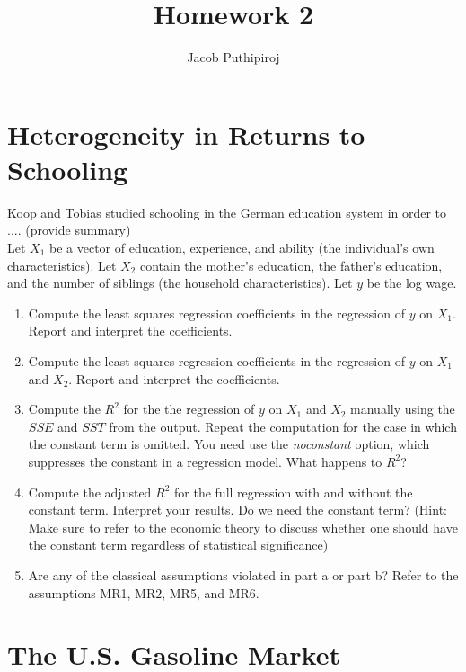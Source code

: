 \documentclass{article}
\begin{document}
\title{Homework 2}
\author{Jacob Puthipiroj}
\maketitle


\section{Heterogeneity in Returns to Schooling}

Koop and Tobias \cite{koop2004learning} studied schooling in the German education system in order to .... (provide summary)\\


Let $X_1$ be a vector of education, experience, and ability (the individual's own characteristics). Let $X_2$ contain the mother's education, the father's education, and the number of siblings (the household characteristics). Let $y$ be the log wage.

\begin{enumerate}[label=\alph*.]
\item Compute the least squares regression coefficients in the regression of $y$ on $X_1$. Report and interpret the coefficients.
\item Compute the least squares regression coefficients in the regression of $y$  on $X_1$ and $X_2$. Report and interpret the coefficients.
\item Compute the $R^2$ for the the regression of $y$ on $X_1$ and $X_2$ manually using the $SSE$ and $SST$ from the output. Repeat the computation for the case in which the constant term is omitted. You need use the \textit{noconstant} option, which suppresses the constant in a regression model. What happens to $R^2$?
\item Compute the adjusted $R^2$ for the full regression with and without the constant term. Interpret your results. Do we need the constant term? (Hint: Make sure to refer to the economic theory to discuss whether one should have the constant term regardless of statistical significance)
\item Are any of the classical assumptions violated in part a or part b? Refer to the assumptions MR1, MR2, MR5, and MR6.
\end{enumerate}

\section{The U.S. Gasoline Market}
\end{document}

